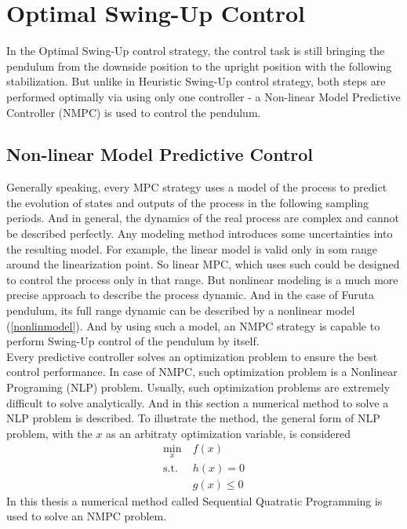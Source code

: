 \section{Optimal Swing-Up Control}\label{nmpcsection}
In the Optimal Swing-Up control strategy, the control task is still bringing the pendulum from the downside position to the upright position with the following stabilization. But unlike in Heuristic Swing-Up control strategy, both steps are performed optimally via using only one controller - a Non-linear Model Predictive Controller (NMPC) is used to control the pendulum.\\
\subsection{Non-linear Model Predictive Control}
Generally speaking, every MPC strategy uses a model of the process to predict the evolution of states and outputs of the process in the following sampling periods. And in general, the dynamics of the real process are complex and cannot be described perfectly. Any modeling method introduces some uncertainties into the resulting model. For example, the linear model is valid only in som range around the linearization point. So linear MPC, which uses such could be designed to control the process only in that range. But nonlinear modeling is a much more precise approach to describe the process dynamic. And in the case of Furuta pendulum, its full range dynamic can be described by a nonlinear model (\ref{nonlinmodel}). And by using such a model, an NMPC strategy is capable to perform Swing-Up control of the pendulum by itself.\\
Every predictive controller solves an optimization problem to ensure the best control performance. In case of NMPC, such optimization problem is a Nonlinear Programing (NLP) problem. Usually, such optimization problems are extremely difficult to solve analytically. And in this section a numerical method to solve a NLP problem is described. To illustrate the method, the general form of NLP problem, with the $x$ as an arbitraty optimization variable, is considered
\begin{subequations}\label{nlpgeneral}
	\begin{align}
	\min_{x}\  &f(x)\label{nlp:obj}\\
	\text{s.t.}\  &h(x) = 0\label{nlp:eq}\\
		 &g(x)\leq 0\label{nlp:ineq}
	\end{align}
\end{subequations}
In this thesis a numerical method called Sequential Quatratic Programming is used to solve an NMPC problem. 
